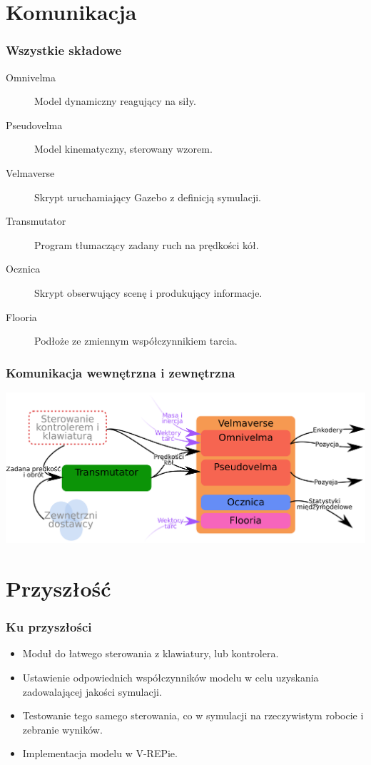\documentclass{beamer}
\begin{document}
	\section{Komunikacja}
	\begin{frame}
		\frametitle{Wszystkie składowe}
		\begin{description}
			\item[Omnivelma] Model dynamiczny reagujący na siły.
			\item[Pseudovelma] Model kinematyczny, sterowany wzorem.
			\item[Velmaverse] Skrypt uruchamiający Gazebo z definicją symulacji.
			\item[Transmutator] Program tłumaczący zadany ruch na prędkości kół.
			\item[Ocznica] Skrypt obserwujący scenę i produkujący informacje.
			\item[Flooria] Podłoże ze zmiennym współczynnikiem tarcia.
		\end{description}
	\end{frame}
	\begin{frame}
		\frametitle{Komunikacja wewnętrzna i zewnętrzna}
		\centering
		\includegraphics[width=\textwidth]{graphics/comm.pdf}
	\end{frame}
 
	\section{Przyszłość}
	\begin{frame}
		\frametitle{Ku przyszłości}
		\begin{itemize}
			\item Moduł do łatwego sterowania z klawiatury, lub kontrolera.
			\item Ustawienie odpowiednich współczynników modelu w celu uzyskania zadowalającej jakości symulacji.
			\item Testowanie tego samego sterowania, co w symulacji na rzeczywistym robocie i zebranie wyników.
			\item Implementacja modelu w V-REPie. 
		\end{itemize}
	\end{frame}
\end{document}
